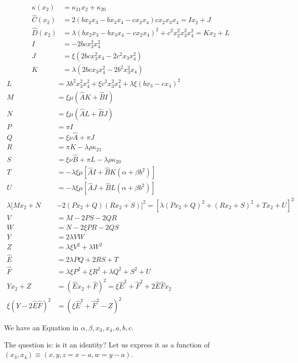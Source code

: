 \documentclass[12pt]{article}
\numberwithin{table}{section}
\begin{document}
\begin{align}
\kappa(x_2) &= \kappa_{21} x_2 + \kappa_{20}\\
\hat C(x_2) &= 2(bx_2x_3 - b x_3x_4 - cx_2 x_4 )cx_2 x_3 x_4 = Ix_2 + J \\
\hat D(x_2) &= \lambda (bx_2x_3 - b x_3x_4 - cx_2 x_4 )^2 + c^2x_2^2 x_3^2 x_4^2 = K x_2 + L \\
I &= - 2b cx_3^2x_4^2\\
J &= \xi (2bcx_3^2 x_4 - 2c^2 x_3 x_4^2)\\
K &= \lambda (2bc x_3 x_4^2 - 2b^2x_3^2 x_4 )\end{align}
\begin{align}
L &= \lambda b^2 x_3^2 x_4^2 + \xi c^2x_3^2 x_4^2+\lambda \xi (bx_3 - c x_4)^2\\
M &= \xi \mu(\hat AK  + \hat BI ) \\
N &= \xi \mu(\hat AL + \hat BJ) \\
P &= \pi I \\
Q &= \xi \nu \hat A + \pi J \\
R &= \pi K - \lambda \rho \kappa_{21}  \\
S &=\xi \nu \hat B + \pi L - \lambda \rho \kappa_{20} \\ 
T &= - \lambda \xi \mu [\hat AI  + \hat BK  (\alpha + \beta b^2)]\\
U &= - \lambda\xi \mu [\hat A J + \hat B L(\alpha + \beta b^2)]\\
\lambda [Mx_2 + N &-2 (Px_2 + Q)(Rx_2 + S) ]^2  = [\lambda\left(Px_2 + Q\right)^2 + \left(Rx_2 + S\right) ^2 + T x_2 + U]^2 \\
V &= M-2PS -2 QR\\
W &= N -2\xi PR-2 QS \\
Y &= 2\lambda VW\\
Z &= \lambda\xi V^2 + \lambda W^2 \\
\hat E &= 2\lambda PQ + 2RS + T\\
\hat F &= \lambda\xi P^2 +\xi R^2 + \lambda Q^2 + S^2 + U \\
Yx_2 + Z &= (\hat E x_2 + \hat F)^2 =  \xi \hat E^2 + \hat F^2 + 2\hat E\hat F x_2 \\
\xi (Y - 2\hat E\hat F)^2 &= \left(\xi \hat E^2 + \hat F^2 - Z\right)^2 
\end{align}

We have an Equation in $\alpha, \beta, x_3, x_4, a, b, c$.

The question is: is it an identity? Let us express it as a function of $(x_3,x_4) \equiv (x,y,z=x-a,w=y-a)$.
\end{document}

